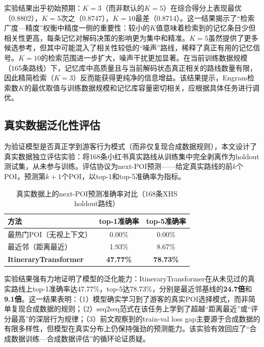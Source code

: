 \documentclass[12pt,a4paper]{ctexart}
\newenvironment{tighttable}
  {\setstretch{1.0}\small}
  {}
\begin{document}
实验结果出乎初始预期：$K=3$（而非默认的$K=5$）在综合得分上表现最优（0.8802），$K=5$次之（0.8747），$K=10$最差（0.8714）。这一结果揭示了“检索广度—精度”权衡中精度一侧的重要性：较小的$K$值意味着检索到的记忆条目少但相关性更高，每条记忆对解码决策的影响更为集中和精准。$K=5$虽然提供了更多候选参考，但其中可能混入了相关性较低的“噪声”路线，稀释了真正有用的记忆信号。$K=10$的检索范围进一步扩大，噪声干扰更加显著。在当前训练数据规模（165条路线）下，记忆库中高质量且与当前解码状态真正相关的路线数量有限，因此精简检索（$K=3$）反而能获得更纯净的信息增益。该结果提示，Engram检索数$K$的最优取值与训练数据规模和记忆库容量密切相关，应根据具体任务进行调优。

\subsection{真实数据泛化性评估}

为验证模型是否真正学到游客行为模式（而非仅复现合成数据规则），本文设计了真实数据独立评估实验：将168条小红书真实路线从训练集中完全剥离作为holdout测试集，从未参与训练。评估协议为next-POI预测——给定真实路线的前$k$个POI，预测第$k+1$个POI，以top-1和top-5准确率为指标。

\begin{table}[H]
\centering
\caption{真实数据上的next-POI预测准确率对比（168条XHS holdout路线）}
\label{tab:real_data_eval}
\begin{tighttable}
\begin{tabular}{lcc}
\toprule
方法 & top-1准确率 & top-5准确率 \\
\midrule
最热门POI（无视上下文） & 0.00\% & 0.00\% \\
最近邻（距离最近） & 1.93\% & 8.67\% \\
\textbf{ItineraryTransformer} & \textbf{47.77\%} & \textbf{78.73\%} \\
\bottomrule
\end{tabular}
\end{tighttable}
\end{table}

实验结果强有力地证明了模型的泛化能力：ItineraryTransformer在从未见过的真实路线上top-1准确率达47.77\%，top-5达78.73\%，分别是最近邻基线的\textbf{24.7倍}和\textbf{9.1倍}。这一结果表明：（1）模型确实学习到了游客的真实POI选择模式，而非简单复现合成数据的规则；（2）seq2seq范式在该任务上学到了超越“距离最近”或“评分最高”的深层行为规律；（3）前文观察到的train-val loss gap主要源于合成数据的有限多样性，但模型在真实分布上仍保持强劲的预测能力。该实验有效回应了“合成数据训练—合成数据评估”的循环论证质疑。
\end{document}
